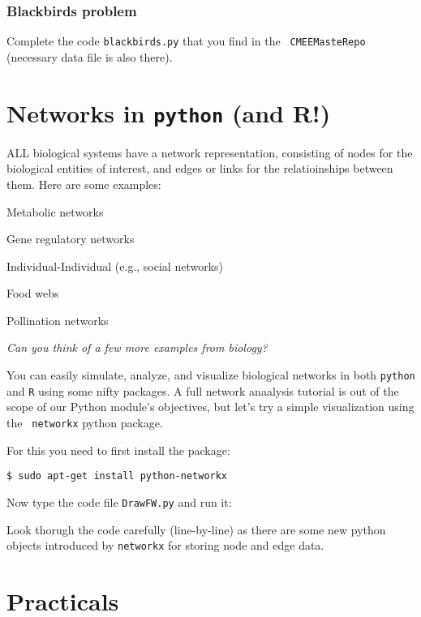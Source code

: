 \subsubsection{Blackbirds problem}

Complete the code {\tt blackbirds.py} that you find in the {\tt 
CMEEMasteRepo} (necessary data file is also there).

\section{Networks in {\tt python} (and R!)}

ALL biological systems have a network representation, consisting of 
nodes for the biological entities of interest, and edges or links for 
the relatioinships between them. Here are some examples:

\begin{compactitem}
	\item Metabolic networks
	\item Gene regulatory networks
	\item Individual-Individual (e.g., social networks)
	\item Food webs
	\item Pollination networks
\end{compactitem} 
{\it Can you think of a few more examples from biology?}

You can easily simulate, analyze, and visualize biological networks in 
both {\tt python} and {\tt R} using some nifty packages. A full network 
anaalysis tutorial is out of the scope of our Python module's 
objectives, but let's try a simple visualization using the {\tt 
networkx} python package. 

For this you need to first install the package:

\begin{lstlisting}
$ sudo apt-get install python-networkx	
\end{lstlisting}
 
Now type the code file {\tt DrawFW.py} and run it:



Look thorugh the code carefully (line-by-line) as there are some new 
python objects introduced by {\tt networkx} for storing node and edge data.

\section{Practicals}

